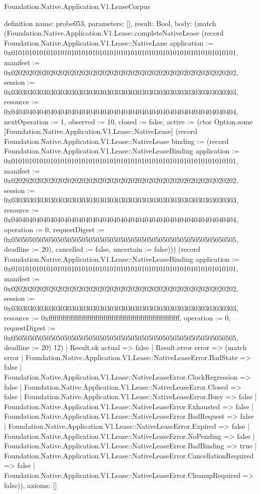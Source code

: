 \begin{lexlean}{Foundation.Native.Application.V1.LeaseCorpus}
\begin{semanticmodule}
definition{
  name: probe053,
  parameters: [],
  result: Bool,
  body: (match (Foundation.Native.Application.V1.Lease::completeNativeLease (record Foundation.Native.Application.V1.Lease::NativeLane {application := 0x0101010101010101010101010101010101010101010101010101010101010101, manifest := 0x0202020202020202020202020202020202020202020202020202020202020202, session := 0x0303030303030303030303030303030303030303030303030303030303030303, resource := 0x0404040404040404040404040404040404040404040404040404040404040404, nextOperation := 1, observed := 10, closed := false, active := (ctor Option.some [Foundation.Native.Application.V1.Lease::NativeLease] (record Foundation.Native.Application.V1.Lease::NativeLease {binding := (record Foundation.Native.Application.V1.Lease::NativeLeaseBinding {application := 0x0101010101010101010101010101010101010101010101010101010101010101, manifest := 0x0202020202020202020202020202020202020202020202020202020202020202, session := 0x0303030303030303030303030303030303030303030303030303030303030303, resource := 0x0404040404040404040404040404040404040404040404040404040404040404, operation := 0, requestDigest := 0x0505050505050505050505050505050505050505050505050505050505050505, deadline := 20}), cancelled := false, uncertain := false}))}) (record Foundation.Native.Application.V1.Lease::NativeLeaseBinding {application := 0x0101010101010101010101010101010101010101010101010101010101010101, manifest := 0x0202020202020202020202020202020202020202020202020202020202020202, session := 0x0303030303030303030303030303030303030303030303030303030303030303, resource := 0xffffffffffffffffffffffffffffffffffffffffffffffffffffffffffffffff, operation := 0, requestDigest := 0x0505050505050505050505050505050505050505050505050505050505050505, deadline := 20}) 12)
    | Result.ok actual => false
    | Result.error error => (match error
      | Foundation.Native.Application.V1.Lease::NativeLeaseError.BadState => false
      | Foundation.Native.Application.V1.Lease::NativeLeaseError.ClockRegression => false
      | Foundation.Native.Application.V1.Lease::NativeLeaseError.Closed => false
      | Foundation.Native.Application.V1.Lease::NativeLeaseError.Busy => false
      | Foundation.Native.Application.V1.Lease::NativeLeaseError.Exhausted => false
      | Foundation.Native.Application.V1.Lease::NativeLeaseError.BadRequest => false
      | Foundation.Native.Application.V1.Lease::NativeLeaseError.Expired => false
      | Foundation.Native.Application.V1.Lease::NativeLeaseError.NoPending => false
      | Foundation.Native.Application.V1.Lease::NativeLeaseError.BadBinding => true
      | Foundation.Native.Application.V1.Lease::NativeLeaseError.CancellationRequired => false
      | Foundation.Native.Application.V1.Lease::NativeLeaseError.CleanupRequired => false)),
  axioms: []
}


\end{semanticmodule}
\end{lexlean}
